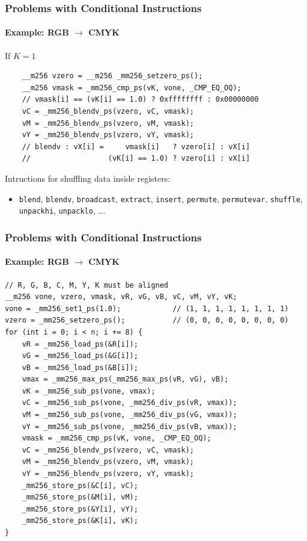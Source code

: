 \documentclass[xcolor={x11names,svgnames}]{beamer}
\begin{document}

\begin{frame}[fragile=singleslide]
  \frametitle{Problems with Conditional Instructions}
  \framesubtitle{Example: RGB $\rightarrow$ CMYK}

  \begin{exampleblock}{If $K = 1$}
\begin{verbatim}
    __m256 vzero = __m256 _mm256_setzero_ps();
    __m256 vmask = _mm256_cmp_ps(vK, vone, _CMP_EQ_OQ);
    // vmask[i] == (vK[i] == 1.0) ? 0xffffffff : 0x00000000 
    vC = _mm256_blendv_ps(vzero, vC, vmask);
    vM = _mm256_blendv_ps(vzero, vM, vmask);
    vY = _mm256_blendv_ps(vzero, vY, vmask);
    // blendv : vX[i] =     vmask[i]   ? vzero[i] : vX[i]
    //                  (vK[i] == 1.0) ? vzero[i] : vX[i]   
\end{verbatim}
  \end{exampleblock}

  \begin{block}{Intructions for shuffling data inside registers:}
  \begin{itemize}
  \item \texttt{blend}, \texttt{blendv}, \texttt{broadcast}, \texttt{extract}, \texttt{insert}, \texttt{permute},  \texttt{permutevar}, \texttt{shuffle}, \texttt{unpackhi}, \texttt{unpacklo}, ...
  \end{itemize}
\end{block}
\end{frame}


\begin{frame}[fragile=singleslide]
  \frametitle{Problems with Conditional Instructions}
  \framesubtitle{Example: RGB $\rightarrow$ CMYK}

\begin{verbatim}
// R, G, B, C, M, Y, K must be aligned
__m256 vone, vzero, vmask, vR, vG, vB, vC, vM, vY, vK;
vone = _mm256_set1_ps(1.0);            // (1, 1, 1, 1, 1, 1, 1, 1)
vzero = _mm256_setzero_ps();           // (0, 0, 0, 0, 0, 0, 0, 0)
for (int i = 0; i < n; i += 8) {
    vR = _mm256_load_ps(&R[i]);
    vG = _mm256_load_ps(&G[i]);
    vB = _mm256_load_ps(&B[i]);
    vmax = _mm256_max_ps(_mm256_max_ps(vR, vG), vB);
    vK = _mm256_sub_ps(vone, vmax);
    vC = _mm256_sub_ps(vone, _mm256_div_ps(vR, vmax));
    vM = _mm256_sub_ps(vone, _mm256_div_ps(vG, vmax));
    vY = _mm256_sub_ps(vone, _mm256_div_ps(vB, vmax));
    vmask = _mm256_cmp_ps(vK, vone, _CMP_EQ_OQ);
    vC = _mm256_blendv_ps(vzero, vC, vmask);
    vM = _mm256_blendv_ps(vzero, vM, vmask);
    vY = _mm256_blendv_ps(vzero, vY, vmask);
    _mm256_store_ps(&C[i], vC);
    _mm256_store_ps(&M[i], vM);
    _mm256_store_ps(&Y[i], vY);
    _mm256_store_ps(&K[i], vK);
}
\end{verbatim}
\end{frame}
\end{document}
